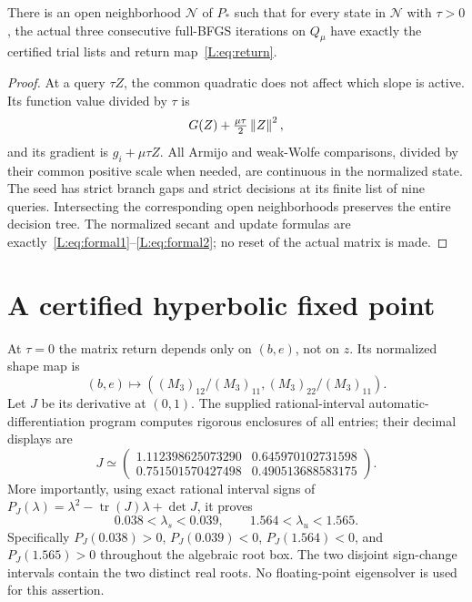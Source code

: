 \begin{lemma}\label{L:lem:agreement}
There is an open neighborhood $\mathcal N$ of $P_*$ such that for every state in $\mathcal N$ with $\tau>0$, the actual three consecutive full-BFGS iterations on $Q_\mu$ have exactly the certified trial lists and return map~\eqref{L:eq:return}.
\end{lemma}
\begin{proof}
At a query $\tau Z$, the common quadratic does not affect which slope is active. Its function value divided by $\tau$ is
\[
 G(Z)+\tfrac{\mu\tau}{2}\left\lVert Z\right\rVert^2,
\]
and its gradient is $g_i+\mu\tau Z$. All Armijo and weak-Wolfe comparisons, divided by their common positive scale when needed, are continuous in the normalized state. The seed has strict branch gaps and strict decisions at its finite list of nine queries. Intersecting the corresponding open neighborhoods preserves the entire decision tree. The normalized secant and update formulas are exactly~\eqref{L:eq:formal1}--\eqref{L:eq:formal2}; no reset of the actual matrix is made.
\end{proof}


\setcounter{section}{3}
\setcounter{theorem}{2}
\setcounter{lemma}{1}
\setcounter{corollary}{0}
\setcounter{proposition}{0}
\setcounter{remark}{0}
\setcounter{equation}{2}


\section{A certified hyperbolic fixed point}

At $\tau=0$ the matrix return depends only on $(b,e)$, not on $z$. Its normalized shape map is
\[
 (b,e)\longmapsto ((M_3)_{12}/(M_3)_{11},(M_3)_{22}/(M_3)_{11}).
\]
Let $J$ be its derivative at $(0,1)$. The supplied rational-interval automatic-differentiation program computes rigorous enclosures of all entries; their decimal displays are
\[
 J\simeq\begin{pmatrix}
 1.112398625073290&0.645970102731598\\
 0.751501570427498&0.490513688583175
 \end{pmatrix}.
\]
More importantly, using exact rational interval signs of
$P_J(\lambda)=\lambda^2-\operatorname{tr}(J)\lambda+\det J$, it proves
\begin{equation}\label{L:eq:eigshape}
 0.038<\lambda_s<0.039,\qquad 1.564<\lambda_u<1.565.
\end{equation}
Specifically $P_J(0.038)>0$, $P_J(0.039)<0$, $P_J(1.564)<0$, and $P_J(1.565)>0$ throughout the algebraic root box. The two disjoint sign-change intervals contain the two distinct real roots. No floating-point eigensolver is used for this assertion.

